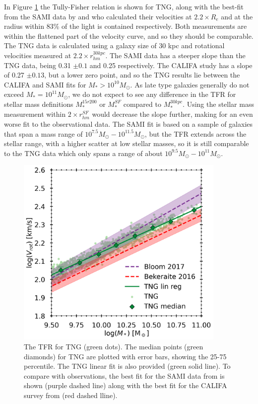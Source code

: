 In Figure \ref{TFR} the Tully-Fisher relation is shown for TNG, along with the best-fit from the SAMI data by \textcite{Bloom2017} and \textcite{Bekerait2016} who calculated their velocities at $2.2 \times R_e$ and at the radius within 83\% of the light is contained respectively. Both measurements are within the flattened part of the velocity curve, and so they should be comparable. The TNG data is calculated using a galaxy size of 30 kpc and rotational velocities measured at $2.2 \times r_{hm}^{30kpc}$. The SAMI data has a steeper slope than the TNG data, being 0.31 $\pm 0.1$ and 0.25 respectively. The CALIFA study has a slope of 0.27 $\pm 0.13$, but a lower zero point, and so the TNG results lie between the CALIFA and SAMI fits for $M_\ast > 10^{10}M_{\odot}$. As late type galaxies generally do not exceed $M_\ast = 10^{11} M_{\odot}$, we do not expect to see any difference in the TFR for stellar mass definitions $M_\ast^{15r200}$ or $M_\ast^{SF}$ compared to $M_\ast^{30kpc}$. Using the stellar mass measurement within $2 \times r_{hm}^{SF}$ would decrease the slope further, making for an even worse fit to the observational data. The SAMI fit is based on a sample of galaxies that span a mass range of $10^{7.5} M_{\odot} - 10^{11.5} M_{\odot}$, but the TFR extends across the stellar range, with a higher scatter at low stellar masses, so it is still comparable to the TNG data which only spans a range of about $10^{9.5} M_{\odot} - 10^{11} M_{\odot}$. 
\begin{figure}
    \centering
    \includegraphics[width=0.9\textwidth]{images/TFR.png}
    \caption{The TFR for TNG (green dots). The median points (green diamonds) for TNG are plotted with error bars, showing the 25-75 percentile. The TNG linear fit is also provided (green solid line). To compare with observations, the best fit for the SAMI data from \textcite{Bloom2017} is shown (purple dashed line) along with the best fit for the CALIFA survey from \textcite{Bekerait2016} (red dashed lline).}
    \label{TFR}
\end{figure}


